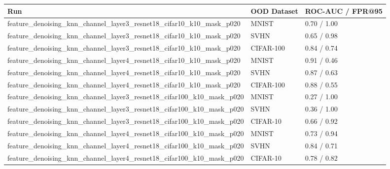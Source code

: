 \begin{tabular}{lll}
\toprule
Run & OOD Dataset & ROC-AUC / FPR@95 \\
\midrule
feature\_denoising\_knn\_channel\_layer3\_resnet18\_cifar10\_k10\_mask\_p020 & MNIST & 0.70 / 1.00 \\
feature\_denoising\_knn\_channel\_layer3\_resnet18\_cifar10\_k10\_mask\_p020 & SVHN & 0.65 / 0.98 \\
feature\_denoising\_knn\_channel\_layer3\_resnet18\_cifar10\_k10\_mask\_p020 & CIFAR-100 & 0.84 / 0.74 \\
feature\_denoising\_knn\_channel\_layer4\_resnet18\_cifar10\_k10\_mask\_p020 & MNIST & 0.91 / 0.46 \\
feature\_denoising\_knn\_channel\_layer4\_resnet18\_cifar10\_k10\_mask\_p020 & SVHN & 0.87 / 0.63 \\
feature\_denoising\_knn\_channel\_layer4\_resnet18\_cifar10\_k10\_mask\_p020 & CIFAR-100 & 0.88 / 0.55 \\
feature\_denoising\_knn\_channel\_layer3\_resnet18\_cifar100\_k10\_mask\_p020 & MNIST & 0.27 / 1.00 \\
feature\_denoising\_knn\_channel\_layer3\_resnet18\_cifar100\_k10\_mask\_p020 & SVHN & 0.36 / 1.00 \\
feature\_denoising\_knn\_channel\_layer3\_resnet18\_cifar100\_k10\_mask\_p020 & CIFAR-10 & 0.66 / 0.92 \\
feature\_denoising\_knn\_channel\_layer4\_resnet18\_cifar100\_k10\_mask\_p020 & MNIST & 0.73 / 0.94 \\
feature\_denoising\_knn\_channel\_layer4\_resnet18\_cifar100\_k10\_mask\_p020 & SVHN & 0.84 / 0.71 \\
feature\_denoising\_knn\_channel\_layer4\_resnet18\_cifar100\_k10\_mask\_p020 & CIFAR-10 & 0.78 / 0.82 \\
\bottomrule
\end{tabular}
